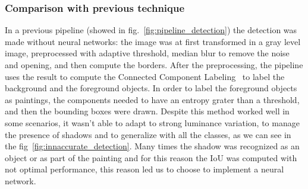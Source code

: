 \subsubsection{Comparison with previous technique}
In a previous pipeline (showed in fig.~\ref{fig:pipeline_detection}) the detection was made without neural networks: the image was at first transformed in a gray level image, preprocessed with adaptive threshold, median blur \cite{median-blur} to remove the noise and opening, and then compute the borders.
After the preprocessing, the pipeline uses the result to compute the Connected Component Labeling~\cite{Grana_ccl} to label the background and the foreground objects.
In order to label the foreground objects as paintings, the components needed to have an entropy grater than a threshold, and then the bounding boxes were drawn.
Despite this method worked well in some scenarios, it wasn't able to adapt to strong luminance variation, to manage the presence of shadows and to generalize with all the classes, as we can see in the fig~\ref{fig:innaccurate_detection}. Many times the shadow was recognized as an object or as part of the painting and for this reason the IoU was computed with not optimal performance, this reason led us to choose to implement a neural network.

